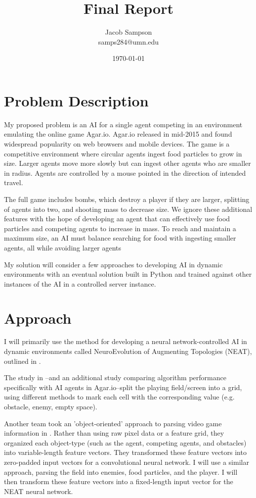 \documentclass[11pt]{article}
\title{Final Report}
\author{
Jacob Sampson\\samps284@umn.edu
}
\date{\today}
\begin{document}
\maketitle

\section*{Problem Description}

My proposed problem is an AI for a single agent competing in an environment emulating the online game Agar.io. Agar.io released in mid-2015 and found widespread popularity on web browsers and mobile devices. The game is a competitive environment where circular agents ingest food particles to grow in size. Larger agents move more slowly but can ingest other agents who are smaller in radius. Agents are controlled by a mouse pointed in the direction of intended travel.

The full game includes bombs, which destroy a player if they are larger, splitting of agents into two, and shooting mass to decrease size. We ignore these additional features with the hope of developing an agent that can effectively use food particles and competing agents to increase in mass. To reach and maintain a maximum size, an AI must balance searching for
food with ingesting smaller agents, all while avoiding larger agents

My solution will consider a few approaches to developing AI in dynamic environments with an eventual solution built in Python and trained against other instances of the AI in a controlled server instance.

\section*{Approach}

I will primarily use the method for developing a neural network-controlled AI in dynamic environments called NeuroEvolution of Augmenting Topologies (NEAT), outlined in \cite{stanley2002evolving}. 

The study in \cite{stanley2002evolving}--and an additional study \cite{anso2019deep} comparing algorithm performance specifically with AI agents in Agar.io--split the playing field/screen into a grid, using different methods to mark each cell with the corresponding value (e.g. obstacle, enemy, empty space).

Another team took an 'object-oriented' approach to parsing video game information in \cite{woof2018learning}. Rather than using raw pixel data or a feature grid, they organized each object-type (such as the agent, competing agents, and obstacles) into variable-length feature vectors. They transformed these feature vectors into zero-padded input vectors for a convolutional neural network. I will use a similar approach, parsing the field into enemies, food particles, and the player. I will then transform these feature vectors into a fixed-length input vector for the NEAT neural network.
\end{document}
